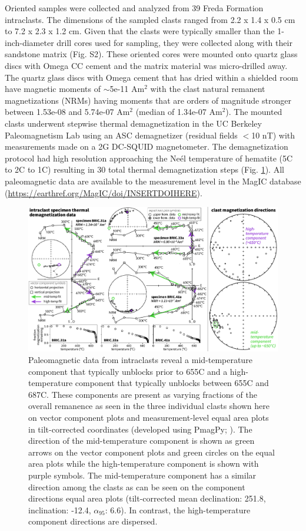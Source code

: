 \documentclass[draft]{agujournal2019}
\begin{document}
Oriented samples were collected and analyzed from 39 Freda Formation intraclasts. The dimensions of the sampled clasts ranged from 2.2 x 1.4 x 0.5 cm to 7.2 x 2.3 x 1.2 cm. Given that the clasts were typically smaller than the 1-inch-diameter drill cores used for sampling, they were collected along with their sandstone matrix (Fig. S2). These oriented cores were mounted onto quartz glass discs with Omega CC cement and the matrix material was micro-drilled away. The quartz glass discs with Omega cement that has dried within a shielded room have magnetic moments of $\sim$5e-11 Am$^2$ with the clast natural remanent magnetizations (NRMs) having moments that are orders of magnitude stronger between 1.53e-08 and 5.74e-07 Am$^2$ (median of 1.34e-07 Am$^2$). The mounted clasts underwent stepwise thermal demagnetization in the UC Berkeley Paleomagnetism Lab using an ASC demagnetizer (residual fields $<$10 nT) with measurements made on a 2G DC-SQUID magnetometer. The demagnetization protocol had high resolution  approaching the Ne\'el temperature of hematite (5\textdegree C to 2\textdegree C to 1\textdegree C) resulting in 30 total thermal demagnetization steps (Fig. \ref{fig:intraclast_pmag}). All paleomagnetic data are available to the measurement level in the MagIC database (\url{https://earthref.org/MagIC/doi/INSERTDOIHERE}).

\begin{figure}[!ht]
\noindent\includegraphics[width=\textwidth]{Fig2_BRIC_pmag.pdf}
\caption{\small{Paleomagnetic data from intraclasts reveal a mid-temperature component that typically unblocks prior to 655\textdegree C and a high-temperature component that typically unblocks between 655\textdegree C and 687\textdegree C. These components are present as varying fractions of the overall remanence as seen in the three individual clasts shown here on vector component plots and measurement-level equal area plots in tilt-corrected coordinates (developed using PmagPy; \cite{Tauxe2016a}). The direction of the mid-temperature component is shown as green arrows on the vector component plots and green circles on the equal area plots while the high-temperature component is shown with purple symbols. The mid-temperature component has a similar direction among the clasts as can be seen on the component directions equal area plots (tilt-corrected mean declination: 251.8, inclination: -12.4, $\alpha_{95}$: 6.6). In contrast, the high-temperature component directions are dispersed.}}
\label{fig:intraclast_pmag}
\end{figure}
\end{document}

